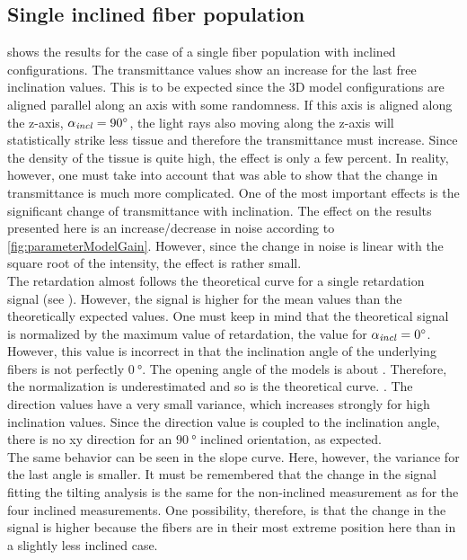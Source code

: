 \subsection{Single inclined fiber population}
 shows the results for the case of a single fiber population with inclined configurations.
The transmittance values show an increase for the last free inclination values.
This is to be expected since the 3D model configurations are aligned parallel along an axis with some randomness.
If this axis is aligned along the z-axis, \ie{} $\textnormal{$\alpha_{\mathit{incl}}$}=\SI{90}{\degree}$, the light rays also moving along the z-axis will statistically strike less tissue and therefore the transmittance must increase.
Since the density of the tissue is quite high, the effect is only a few percent.
In reality, however, one must take into account that \cite{Menzel2021} was able to show that the change in transmittance is much more complicated.
One of the most important effects is the significant change of transmittance with inclination.
The effect on the results presented here is an increase/decrease in noise according to \cref{fig:parameterModelGain}.
However, since the change in noise is linear with the square root of the intensity, the effect is rather small.
\\
%
The retardation almost follows the theoretical curve for a single retardation signal (see ).
However, the signal is higher for the mean values than the theoretically expected values.
One must keep in mind that the theoretical signal is normalized by the maximum value of retardation, \ie{} the value for $\textnormal{$\alpha_{\mathit{incl}}$} = \SI{0}{\degree}$.
However, this value is incorrect in that the inclination angle of the underlying fibers is not perfectly $\SI{0}{\degree}$. The opening angle of the models is about \dummy{}.
Therefore, the normalization is underestimated and so is the theoretical curve.
\dummy{}.
%
The direction values have a very small variance, which increases strongly for high inclination values.
Since the direction value is coupled to the inclination angle, there is no xy direction for an $\SI{90}{\degree}$ inclined orientation, as expected.
\\
%
The same behavior can be seen in the slope curve.
Here, however, the variance for the last angle is smaller.
It must be remembered that the change in the signal fitting the tilting analysis is the same for the non-inclined measurement as for the four inclined measurements.
One possibility, therefore, is that the change in the signal is higher because the fibers are in their most extreme position here than in a slightly less inclined case.
